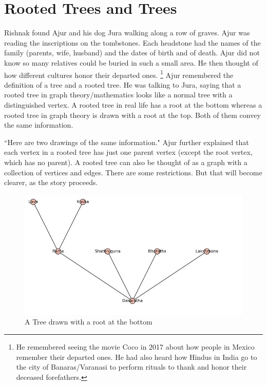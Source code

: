 \chapter{Rooted Trees and Trees}

Rishnak found Ajur and his dog Jura walking along a row of graves. Ajur was reading the inscriptions on the tombstones. Each headstone had the names of the family (parents, wife, husband) and the dates of birth and of death. Ajur did not know so many relatives could be buried in such a small area. He then thought of how different cultures honor their departed ones. \footnote{He remembered seeing the movie Coco in 2017 about how people in Mexico remember their departed ones. He had also heard how Hindus in India go to the city of Banaras/Varanasi to perform rituals to thank and honor their deceased forefathers.} 
Ajur remembered the definition of a tree and a rooted tree. He was talking to Jura, saying that a rooted tree in graph theory/mathematics looks like a normal tree with a distinguished vertex. A rooted tree in real life has a root at the bottom whereas a rooted tree in graph theory is drawn with a root at the top. Both of them convey the same information.

``Here are two drawings of the same information." Ajur further explained that each vertex in a rooted tree has just one parent vertex (except the root vertex, which has no parent). A rooted tree can also be thought of as a graph with a collection of vertices and edges. There are some restrictions. But that will become clearer, as the story proceeds.


\begin{figure}
\begin{center}
\includegraphics[width=\textwidth]{tree1.JPG}
\caption{A Tree drawn with a root at the bottom}\label{rg1}
\end{center}
\end{figure}

